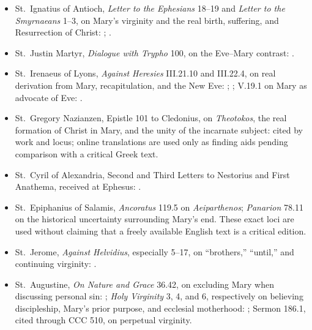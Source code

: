 \begin{itemize}
  \item St.~Ignatius of Antioch, \emph{Letter to the Ephesians} 18--19 and \emph{Letter to the Smyrnaeans} 1--3, on Mary's virginity and the real birth, suffering, and Resurrection of Christ: ; .
  \item St.~Justin Martyr, \emph{Dialogue with Trypho} 100, on the Eve--Mary contrast: .
  \item St.~Irenaeus of Lyons, \emph{Against Heresies} III.21.10 and III.22.4, on real derivation from Mary, recapitulation, and the New Eve: ; ; V.19.1 on Mary as advocate of Eve: .
  \item St.~Gregory Nazianzen, Epistle 101 to Cledonius, on \emph{Theotokos}, the real formation of Christ in Mary, and the unity of the incarnate subject: cited by work and locus; online translations are used only as finding aids pending comparison with a critical Greek text.
  \item St.~Cyril of Alexandria, Second and Third Letters to Nestorius and First Anathema, received at Ephesus: .
  \item St.~Epiphanius of Salamis, \emph{Ancoratus} 119.5 on \emph{Aeiparthenos}; \emph{Panarion} 78.11 on the historical uncertainty surrounding Mary's end. These exact loci are used without claiming that a freely available English text is a critical edition.
  \item St.~Jerome, \emph{Against Helvidius}, especially 5--17, on ``brothers,'' ``until,'' and continuing virginity: .
  \item St.~Augustine, \emph{On Nature and Grace} 36.42, on excluding Mary when discussing personal sin: ; \emph{Holy Virginity} 3, 4, and 6, respectively on believing discipleship, Mary's prior purpose, and ecclesial motherhood: ; Sermon 186.1, cited through CCC 510, on perpetual virginity.

\end{itemize}
